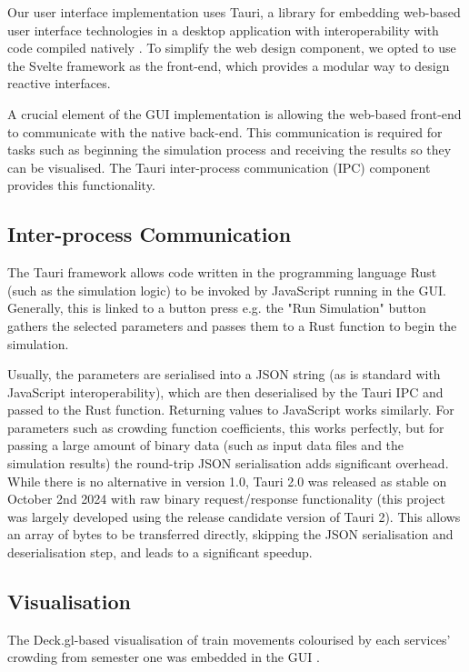 Our user interface implementation uses Tauri, a library for embedding web-based user interface technologies in a desktop application with interoperability with code compiled natively \cite{TauriappsTauri2024}. To simplify the web design component, we opted to use the Svelte \cite{SveltejsSvelte2024} framework as the front-end, which provides a modular way to design reactive interfaces.

A crucial element of the GUI implementation is allowing the web-based front-end to communicate with the native back-end. This communication is required for tasks such as beginning the simulation process and receiving the results so they can be visualised. The Tauri inter-process communication (IPC) component provides this functionality.

\subsection{Inter-process Communication}
The Tauri framework allows code written in the programming language Rust (such as the simulation logic) to be invoked by JavaScript running in the GUI. Generally, this is linked to a button press e.g. the "Run Simulation" button gathers the selected parameters and passes them to a Rust function to begin the simulation.

Usually, the parameters are serialised into a JSON string (as is standard with JavaScript interoperability), which are then deserialised by the Tauri IPC and passed to the Rust function. Returning values to JavaScript works similarly. For parameters such as crowding function coefficients, this works perfectly, but for passing a large amount of binary data (such as input data files and the simulation results) the round-trip JSON serialisation adds significant overhead. While there is no alternative in version 1.0, Tauri 2.0 was released as stable on October 2nd 2024 with raw binary request/response functionality (this project was largely developed using the release candidate version of Tauri 2). This allows an array of bytes to be transferred directly, skipping the JSON serialisation and deserialisation step, and leads to a significant speedup.

\subsection{Visualisation}
The Deck.gl-based visualisation of train movements colourised by each services' crowding from semester one was embedded in the GUI \cite{benjaminsutherlandSimulatingMelbournesMetropolitan2024}. 

